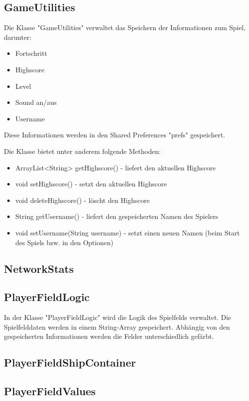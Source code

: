 \documentclass[11pt]{article} %
\begin{document}
\subsection{GameUtilities}
Die Klasse "GameUtilities" verwaltet das Speichern der Informationen zum Spiel, darunter:
\begin{itemize}
\item Fortschritt
\item Highscore
\item Level
\item Sound an/aus
\item Username
\end{itemize}

Diese Informationen werden in den Shared Preferences "prefs" gespeichert. 

Die Klasse bietet unter anderem folgende Methoden:
\begin{itemize}
\item ArrayList<String> getHighscore() - liefert den aktuellen Highscore
\item void setHighscore() - setzt den aktuellen Highscore
\item void deleteHighscore() - löscht den Highscore

\item String getUsername() - liefert den gespeicherten Namen des Spielers
\item void setUsername(String username) - setzt einen neuen Namen (beim Start des Spiels bzw. in den Optionen)
\end{itemize}

\subsection{NetworkStats}

\subsection{PlayerFieldLogic}
In der Klasse "PlayerFieldLogic" wird die Logik des Spielfelds verwaltet. Die Spielfelddaten werden in einem String-Array gespeichert. Abhängig von den gespeicherten Informationen werden die Felder unterschiedlich gefärbt.

\subsection{PlayerFieldShipContainer}

\subsection{PlayerFieldValues}
\end{document}
